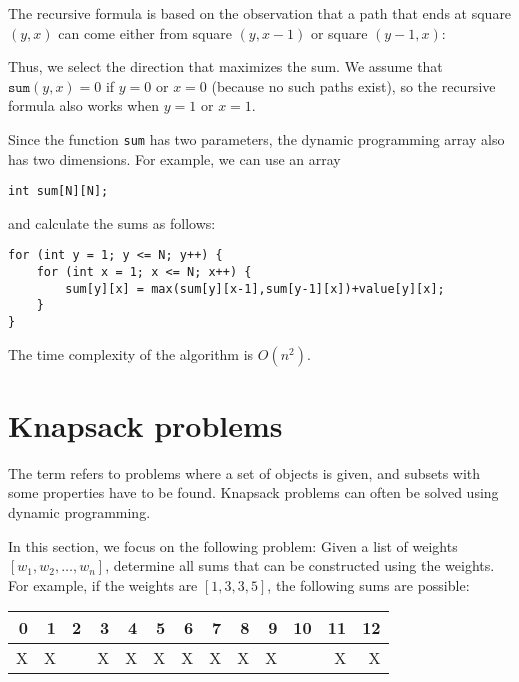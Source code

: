 The recursive formula is based on the observation
that a path that ends at square $(y,x)$
can come either from square $(y,x-1)$
or square $(y-1,x)$:
\begin{center}
\end{center}

Thus, we select the direction that maximizes
the sum.
We assume that $\texttt{sum}(y,x)=0$
if $y=0$ or $x=0$ (because no such paths exist),
so the recursive formula also works when $y=1$ or $x=1$.

Since the function \texttt{sum} has two parameters,
the dynamic programming array also has two dimensions.
For example, we can use an array
\begin{lstlisting}
int sum[N][N];
\end{lstlisting}
and calculate the sums as follows:
\begin{lstlisting}
for (int y = 1; y <= N; y++) {
    for (int x = 1; x <= N; x++) {
        sum[y][x] = max(sum[y][x-1],sum[y-1][x])+value[y][x];
    }
}
\end{lstlisting}
The time complexity of the algorithm is $O(n^2)$.

\section{Knapsack problems}


The term  refers to problems where
a set of objects is given, and 
subsets with some properties
have to be found.
Knapsack problems can often be solved
using dynamic programming.

In this section, we focus on the following
problem: Given a list of weights
$[w_1,w_2,\ldots,w_n]$,
determine all
sums that can be constructed using the weights.
For example, if the weights are
$[1,3,3,5]$, the following sums are possible:

\begin{center}
\begin{tabular}{rrrrrrrrrrrrr}
 0 & 1 & 2 & 3 & 4 & 5 & 6 & 7 & 8 & 9 & 10 & 11 & 12 \\
\hline
 X & X & & X & X & X & X & X & X & X & & X & X \\
\end{tabular}
\end{center}

